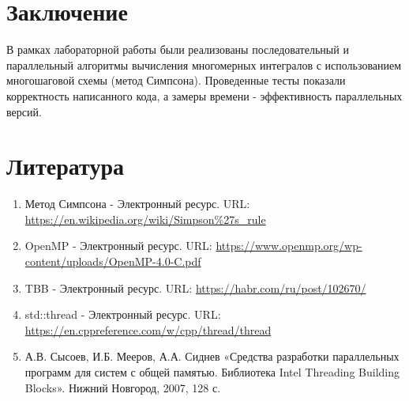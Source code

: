 \documentclass{report}
\begin{document}
\section*{Заключение}
В рамках лабораторной работы были реализованы последовательный и параллельный алгоритмы вычисления многомерных интегралов с использованием многошаговой схемы (метод Симпсона). Проведенные тесты показали корректность написанного кода, а замеры времени - эффективность параллельных версий.
\newpage

\section*{Литература}
\begin{enumerate}
\item Метод Симпсона - Электронный ресурс. URL: \newline \url{https://en.wikipedia.org/wiki/Simpson%27s_rule}
\item OpenMP - Электронный ресурс. URL: \newline \url{https://www.openmp.org/wp-content/uploads/OpenMP-4.0-C.pdf}
\item TBB - Электронный ресурс. URL: \newline \url{https://habr.com/ru/post/102670/}
\item std::thread - Электронный ресурс. URL: \newline \url{https://en.cppreference.com/w/cpp/thread/thread}
\item А.В. Сысоев, И.Б. Мееров, А.А. Сиднев «Средства разработки параллельных программ для систем с общей памятью. Библиотека Intel Threading Building Blocks». Нижний Новгород, 2007, 128 с.
\end{enumerate} 
\newpage

\end{document}
